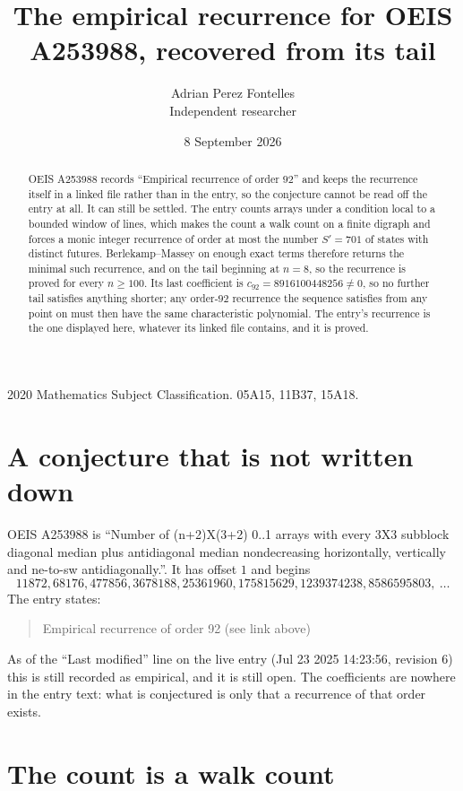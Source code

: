 \documentclass[11pt,a4paper]{article}
\title{The empirical recurrence for OEIS A253988, recovered from its tail}
\author{Adrian Perez Fontelles\\ \small Independent researcher}
\date{8 September 2026}
\theoremstyle{plain}
\theoremstyle{definition}
\begin{document}
\maketitle

\begin{abstract}
OEIS A253988 records ``Empirical recurrence of order $92$'' and keeps the recurrence itself in
a linked file rather than in the entry, so the conjecture cannot be read off the entry at all.
It can still be settled. The entry counts arrays under a condition local to a bounded window of
lines, which makes the count a walk count on a finite digraph and forces a monic integer
recurrence of order at most the number $S'=701$ of states with distinct futures. Berlekamp--Massey on
enough exact terms therefore returns the minimal such recurrence, and on the tail beginning at $n=8$, so the recurrence is proved for every $n\ge100$.
Its last coefficient is $c_{92}=8916100448256\neq0$, so no further tail satisfies anything
shorter; any order-$92$ recurrence the sequence satisfies from any point on must then have
the same characteristic polynomial. The entry's recurrence is the one displayed here, whatever
its linked file contains, and it is proved.
\end{abstract}

\noindent\small 2020 Mathematics Subject Classification. 05A15, 11B37, 15A18.\normalsize

\section{A conjecture that is not written down}

OEIS A253988 is ``Number of (n+2)X(3+2) 0..1 arrays with every 3X3 subblock diagonal median plus antidiagonal median nondecreasing horizontally, vertically and ne-to-sw antidiagonally.''. It has offset $1$ and begins
\[
11872, 68176, 477856, 3678188, 25361960, 175815629, 1239374238, 8586595803,\ \dots
\]
The entry states:
\begin{quote}
Empirical recurrence of order 92 (see link above)
\end{quote}
As of the ``Last modified'' line on the live entry (Jul 23 2025 14:23:56, revision 6)
this is still recorded as empirical, and it is still open. The coefficients are nowhere in the
entry text: what is conjectured is only that a recurrence of that order exists.

\section{The count is a walk count}
\end{document}
